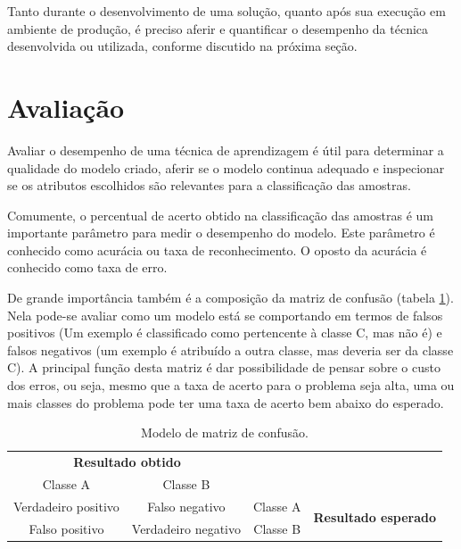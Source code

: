 Tanto durante o desenvolvimento de uma solução, quanto após sua execução em ambiente de produção, é preciso aferir e quantificar o desempenho da técnica desenvolvida ou utilizada, conforme discutido na próxima seção.

\section{Avaliação}\label{sec:avaliacao}

Avaliar o desempenho de uma técnica de aprendizagem é útil para determinar a qualidade do modelo criado, aferir se o modelo continua adequado e inspecionar se os atributos escolhidos são relevantes para a classificação das amostras.

Comumente, o percentual de acerto obtido na classificação das amostras é um importante parâmetro para medir o desempenho do modelo. Este parâmetro é conhecido como acurácia ou taxa de reconhecimento. O oposto da acurácia é conhecido como taxa de erro.

De grande importância também é a composição da matriz de confusão (tabela \ref{tab:matrixConfusao}). Nela pode-se avaliar como um modelo está se comportando em termos de falsos positivos (Um exemplo é classificado como pertencente à classe C, mas não é) e falsos negativos (um exemplo é atribuído a outra classe, mas deveria ser da classe C). A principal função desta matriz é dar possibilidade de pensar sobre o custo dos erros, ou seja, mesmo que a taxa de acerto para o problema seja alta, uma ou mais classes do problema pode ter uma taxa de acerto bem abaixo do esperado.

\begin{table}[h]
  \centering
  \begin{tabular}{cccc}
  \multicolumn{2}{c}{\textbf{Resultado obtido}}                  &                               &                                              \\ \cline{1-2}
  \multicolumn{1}{|c|}{Classe A} & \multicolumn{1}{c|}{Classe B} &                               &                                              \\ \cline{1-3}
  \multicolumn{1}{|c|}{Verdadeiro positivo}       & \multicolumn{1}{c|}{Falso negativo}       & \multicolumn{1}{c|}{Classe A} & \multirow{2}{*}{\textbf{Resultado esperado}} \\ \cline{1-3}
  \multicolumn{1}{|c|}{Falso positivo}       & \multicolumn{1}{c|}{Verdadeiro negativo}       & \multicolumn{1}{c|}{Classe B} &                                              \\ \cline{1-3}
  \end{tabular}
  \caption{Modelo de matriz de confusão.}
  \label{tab:matrixConfusao}
\end{table}

